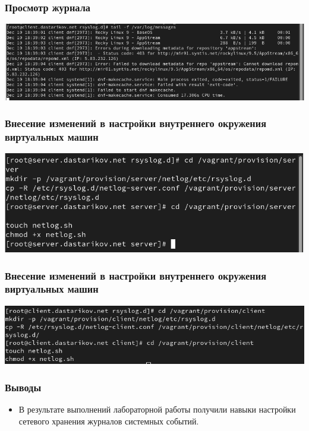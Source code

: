 \begin{frame}
\frametitle{Просмотр журнала}
    \centering
    \includegraphics[width=\textwidth]{../images/image11a.png}
\end{frame}


\begin{frame}
\frametitle{Внесение изменений в настройки внутреннего окружения виртуальных машин}
    \centering
    \includegraphics[width=\textwidth]{../images/image12.png}
\end{frame}


\begin{frame}
\frametitle{Внесение изменений в настройки внутреннего окружения виртуальных машин}
    \centering
    \includegraphics[width=\textwidth]{../images/image13.png}
\end{frame}


\begin{frame}
\frametitle{Выводы}
\begin{itemize}
    \item В результате выполнений лабораторной работы получили навыки настройки сетевого хранения журналов системных событий.
\end{itemize}
\end{frame}

